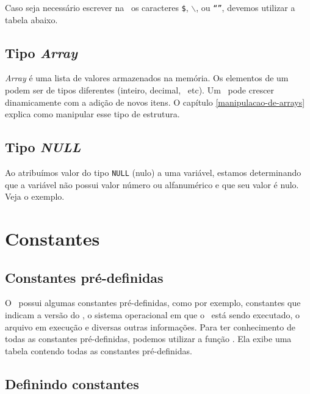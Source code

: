 

Caso seja necessário escrever na \tipostring~os caracteres \texttt{\$}, 
\texttt{$\backslash$}, \texttt{\textquotesingle} ou \texttt{{``''}}, devemos utilizar a tabela abaixo. 

% 

\subsection{Tipo \textit{Array}}
\label{tipo-array}

\textit{Array} é uma lista de valores armazenados na memória. Os elementos de um \tipoarray~
podem ser de tipos diferentes (inteiro, decimal, \tipostring~etc). Um \tipoarray~pode crescer
dinamicamente com a adição de novos itens. O capítulo \ref{manipulacao-de-arrays} explica como
manipular esse tipo de estrutura.

\subsection{Tipo \textit{NULL}}
\label{tipo-null}

Ao atribuímos valor do tipo \texttt{NULL} (nulo) a uma variável, estamos determinando
que a variável não possui valor número ou alfanumérico e que seu valor é nulo. Veja o exemplo.



\section{Constantes}
\label{constantes}

\subsection{Constantes pré-definidas}
\label{constantes-pre-definidas}

O \php~possui algumas constantes pré-definidas, como por exemplo, constantes que indicam a versão
do \php, o sistema operacional em que o \php~está sendo executado, o arquivo em execução
e diversas outras informações. Para ter conhecimento de todas as constantes pré-definidas,
podemos utilizar a função \funcaophpinfo. Ela exibe uma tabela contendo todas as constantes
pré-definidas.

\subsection{Definindo constantes}
\label{definindo-constantes}

